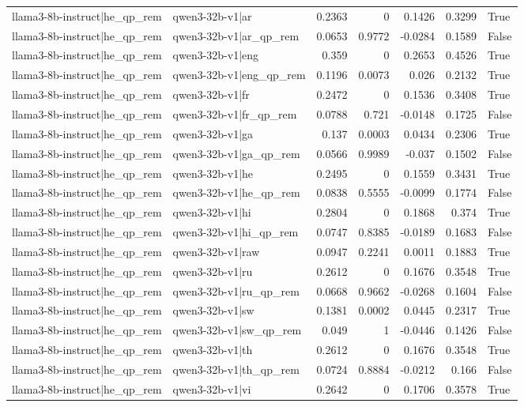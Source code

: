 \begin{table}
\begin{tabular}{l l r r r r l}
llama3-8b-instruct|he_qp_rem & qwen3-32b-v1|ar & 0.2363 & 0 & 0.1426 & 0.3299 & True \\
llama3-8b-instruct|he_qp_rem & qwen3-32b-v1|ar_qp_rem & 0.0653 & 0.9772 & -0.0284 & 0.1589 & False \\
llama3-8b-instruct|he_qp_rem & qwen3-32b-v1|eng & 0.359 & 0 & 0.2653 & 0.4526 & True \\
llama3-8b-instruct|he_qp_rem & qwen3-32b-v1|eng_qp_rem & 0.1196 & 0.0073 & 0.026 & 0.2132 & True \\
llama3-8b-instruct|he_qp_rem & qwen3-32b-v1|fr & 0.2472 & 0 & 0.1536 & 0.3408 & True \\
llama3-8b-instruct|he_qp_rem & qwen3-32b-v1|fr_qp_rem & 0.0788 & 0.721 & -0.0148 & 0.1725 & False \\
llama3-8b-instruct|he_qp_rem & qwen3-32b-v1|ga & 0.137 & 0.0003 & 0.0434 & 0.2306 & True \\
llama3-8b-instruct|he_qp_rem & qwen3-32b-v1|ga_qp_rem & 0.0566 & 0.9989 & -0.037 & 0.1502 & False \\
llama3-8b-instruct|he_qp_rem & qwen3-32b-v1|he & 0.2495 & 0 & 0.1559 & 0.3431 & True \\
llama3-8b-instruct|he_qp_rem & qwen3-32b-v1|he_qp_rem & 0.0838 & 0.5555 & -0.0099 & 0.1774 & False \\
llama3-8b-instruct|he_qp_rem & qwen3-32b-v1|hi & 0.2804 & 0 & 0.1868 & 0.374 & True \\
llama3-8b-instruct|he_qp_rem & qwen3-32b-v1|hi_qp_rem & 0.0747 & 0.8385 & -0.0189 & 0.1683 & False \\
llama3-8b-instruct|he_qp_rem & qwen3-32b-v1|raw & 0.0947 & 0.2241 & 0.0011 & 0.1883 & True \\
llama3-8b-instruct|he_qp_rem & qwen3-32b-v1|ru & 0.2612 & 0 & 0.1676 & 0.3548 & True \\
llama3-8b-instruct|he_qp_rem & qwen3-32b-v1|ru_qp_rem & 0.0668 & 0.9662 & -0.0268 & 0.1604 & False \\
llama3-8b-instruct|he_qp_rem & qwen3-32b-v1|sw & 0.1381 & 0.0002 & 0.0445 & 0.2317 & True \\
llama3-8b-instruct|he_qp_rem & qwen3-32b-v1|sw_qp_rem & 0.049 & 1 & -0.0446 & 0.1426 & False \\
llama3-8b-instruct|he_qp_rem & qwen3-32b-v1|th & 0.2612 & 0 & 0.1676 & 0.3548 & True \\
llama3-8b-instruct|he_qp_rem & qwen3-32b-v1|th_qp_rem & 0.0724 & 0.8884 & -0.0212 & 0.166 & False \\
llama3-8b-instruct|he_qp_rem & qwen3-32b-v1|vi & 0.2642 & 0 & 0.1706 & 0.3578 & True \\

\end{tabular}
\end{table}
